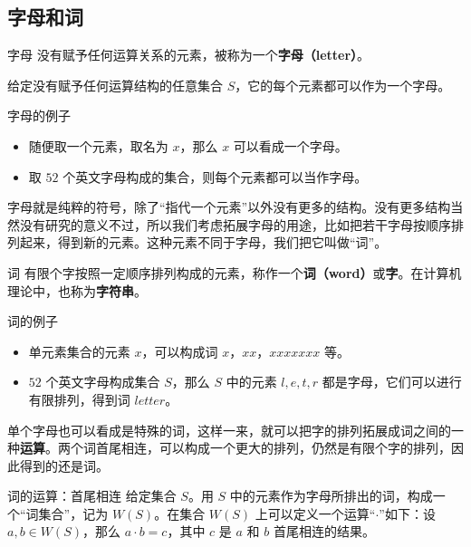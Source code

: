 

\subsection{字母和词}

\begin{definition}{字母}
没有赋予任何运算关系的元素，被称为一个\textbf{字母（letter）}。
\end{definition}

给定没有赋予任何运算结构的任意集合 $S$，它的每个元素都可以作为一个字母。

\begin{example}{字母的例子}
\begin{itemize}
\item 随便取一个元素，取名为 $x$，那么 $x$ 可以看成一个字母。
\item 取 $52$ 个英文字母构成的集合，则每个元素都可以当作字母。
\end{itemize}
\end{example}

字母就是纯粹的符号，除了“指代一个元素”以外没有更多的结构。没有更多结构当然没有研究的意义不过，所以我们考虑拓展字母的用途，比如把若干字母按顺序排列起来，得到新的元素。这种元素不同于字母，我们把它叫做“词”。

\begin{definition}{词}
有限个字按照一定顺序排列构成的元素，称作一个\textbf{词（word）}或\textbf{字}。在计算机理论中，也称为\textbf{字符串}。
\end{definition}

\begin{example}{词的例子}
\begin{itemize}
\item 单元素集合的元素 $x$，可以构成词 $x$，$xx$，$xxxxxxx$ 等。
\item $52$ 个英文字母构成集合 $S$，那么 $S$ 中的元素 $l, e, t, r$ 都是字母，它们可以进行有限排列，得到词 $letter$。
\end{itemize}

\end{example}

单个字母也可以看成是特殊的词，这样一来，就可以把字的排列拓展成词之间的一种\textbf{运算}。两个词首尾相连，可以构成一个更大的排列，仍然是有限个字的排列，因此得到的还是词。

\begin{definition}{词的运算：首尾相连}
给定集合 $S$。用 $S$ 中的元素作为字母所排出的词，构成一个“词集合”，记为 $W(S)$。在集合 $W(S)$ 上可以定义一个运算“$\cdot$”如下：设 $a, b\in W(S)$，那么 $a\cdot b=c$，其中 $c$ 是 $a$ 和 $b$ 首尾相连的结果。
\end{definition}

